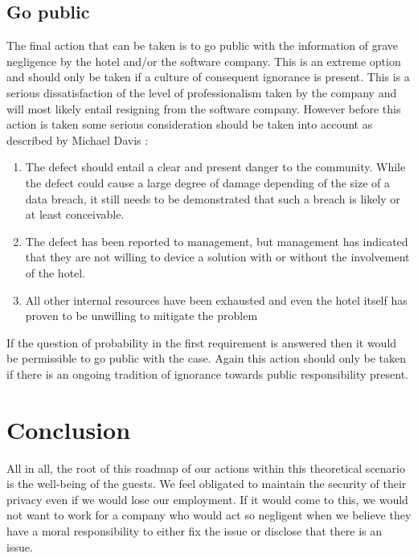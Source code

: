 \subsection*{Go public}
The final action that can be taken is to go public with the information of grave negligence by the hotel and/or the software company. This is an extreme option and should only be taken if a culture of consequent ignorance is present. This is a serious dissatisfaction of the level of professionalism taken by the company and will most likely entail resigning from the software company. However before this action is taken some serious consideration should be taken into account as described by Michael Davis \cite{whistleblowing_paradoxes}:
\begin{enumerate}
\item The defect should entail a clear and present danger to the community. While the defect could cause a large degree of damage depending of the size of a data breach, it still needs to be demonstrated that such a breach is likely or at least conceivable.
\item The defect has been reported to management, but management has indicated that they are not willing to device a solution with or without the involvement of the hotel.
\item All other internal resources have been exhausted and even the hotel itself has proven to be unwilling to mitigate the problem
\end{enumerate}
If the question of probability in the first requirement is answered then it would be permissible to go public with the case. Again this action should only be taken if there is an ongoing tradition of ignorance towards public responsibility present.

\section{Conclusion}
All in all, the root of this roadmap of our actions within this theoretical scenario is the well-being of the guests.  We feel obligated to maintain the security of their privacy even if we would lose our employment. If it would come to this, we would not want to work for a company who would act so negligent when we believe they have a moral responsibility to either fix the issue or disclose that there is an issue.
